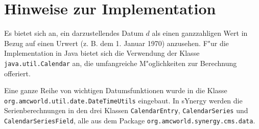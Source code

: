\documentclass[a4paper]{article}
\numberwithin{equation}{section}
\begin{document}
\section{Hinweise zur Implementation}
Es bietet sich an, ein darzustellendes Datum $d$ als einen ganzzahligen Wert in
Bezug auf einen Urwert (z. B. dem 1. Januar 1970) anzusehen. F"ur die
Implementation in Java bietet sich die Verwendung der Klasse
\texttt{java.util.Calendar} an, die umfangreiche M"oglichkeiten zur Berechnung
offeriert.

Eine ganze Reihe von wichtigen Datumsfunktionen wurde in die Klasse
\texttt{org.amcworld.util.date.DateTimeUtils} eingebaut. In sYnergy werden die
Serienberechnungen in den drei Klassen \texttt{CalendarEntry},
\texttt{CalendarSeries} und \texttt{CalendarSeriesField}, alle aus dem Package
\texttt{org.amcworld.synergy.cms.\-data}.
\end{document}
